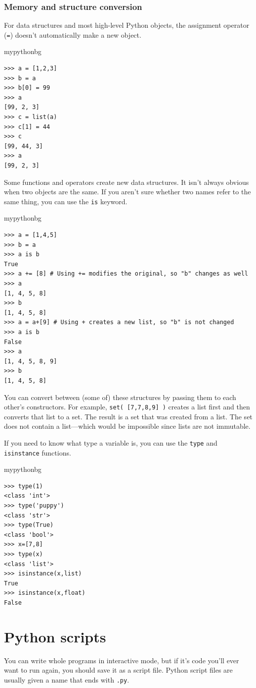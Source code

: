 \subsubsection{Memory and structure conversion}
For data structures and most high-level Python objects,
the assignment operator (\texttt{=}) doesn't automatically make a new object.
\begin{tsession}{mypythonbg}
\begin{verbatim}
>>> a = [1,2,3]
>>> b = a
>>> b[0] = 99
>>> a
[99, 2, 3]
>>> c = list(a)
>>> c[1] = 44
>>> c
[99, 44, 3]
>>> a
[99, 2, 3]
\end{verbatim}
\end{tsession}
Some functions and operators create new data structures.
It isn't always obvious when two objects are the same.
If you aren't sure whether two names refer to the same thing,
you can use the \texttt{is} keyword.
\begin{tsession}{mypythonbg}
\begin{verbatim}
>>> a = [1,4,5]
>>> b = a
>>> a is b
True
>>> a += [8] # Using += modifies the original, so "b" changes as well
>>> a
[1, 4, 5, 8]
>>> b
[1, 4, 5, 8]
>>> a = a+[9] # Using + creates a new list, so "b" is not changed
>>> a is b
False
>>> a
[1, 4, 5, 8, 9]
>>> b
[1, 4, 5, 8]
\end{verbatim}
\end{tsession}

You can convert between (some of) these structures
by passing them to each other's constructors.
For example, \texttt{set( [7,7,8,9] )} creates a list first and then converts that list to a set.
The result is a set that was created from a list.
The set does not contain a list---which would be impossible since lists are not immutable.

If you need to know what type a variable is,
you can use the \texttt{type} and \texttt{isinstance} functions.
\begin{tsession}{mypythonbg}
\begin{verbatim}
>>> type(1)
<class 'int'>
>>> type('puppy')
<class 'str'>
>>> type(True)
<class 'bool'>
>>> x=[7,8]
>>> type(x)
<class 'list'>
>>> isinstance(x,list)
True
>>> isinstance(x,float)
False
\end{verbatim}
\end{tsession}

\section{Python scripts}
You can write whole programs in interactive mode,
but if it's code you'll ever want to run again, you should save it as a script file.
Python script files are usually given a name that ends with \texttt{.py}.

